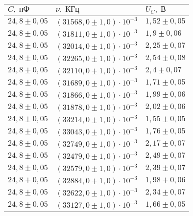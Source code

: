 \begin{tabular}{|l|l|l|}
\hline
$C,\;\text{нФ}$ & $\nu,\;\text{КГц}$ & $U_C,\;\text{В}$\\\hline
$24{,}8 \pm 0{,}05$ & $\left(31568{,}0 \pm 1{,}0\right)\cdot 10^{-3}$ & $1{,}52 \pm 0{,}05$\\\hline
$24{,}8 \pm 0{,}05$ & $\left(31811{,}0 \pm 1{,}0\right)\cdot 10^{-3}$ & $1{,}9 \pm 0{,}06$\\\hline
$24{,}8 \pm 0{,}05$ & $\left(32014{,}0 \pm 1{,}0\right)\cdot 10^{-3}$ & $2{,}25 \pm 0{,}07$\\\hline
$24{,}8 \pm 0{,}05$ & $\left(32265{,}0 \pm 1{,}0\right)\cdot 10^{-3}$ & $2{,}54 \pm 0{,}08$\\\hline
$24{,}8 \pm 0{,}05$ & $\left(32110{,}0 \pm 1{,}0\right)\cdot 10^{-3}$ & $2{,}4 \pm 0{,}07$\\\hline
$24{,}8 \pm 0{,}05$ & $\left(31689{,}0 \pm 1{,}0\right)\cdot 10^{-3}$ & $1{,}71 \pm 0{,}05$\\\hline
$24{,}8 \pm 0{,}05$ & $\left(31866{,}0 \pm 1{,}0\right)\cdot 10^{-3}$ & $1{,}99 \pm 0{,}06$\\\hline
$24{,}8 \pm 0{,}05$ & $\left(31878{,}0 \pm 1{,}0\right)\cdot 10^{-3}$ & $2{,}02 \pm 0{,}06$\\\hline
$24{,}8 \pm 0{,}05$ & $\left(33214{,}0 \pm 1{,}0\right)\cdot 10^{-3}$ & $1{,}55 \pm 0{,}05$\\\hline
$24{,}8 \pm 0{,}05$ & $\left(33043{,}0 \pm 1{,}0\right)\cdot 10^{-3}$ & $1{,}76 \pm 0{,}05$\\\hline
$24{,}8 \pm 0{,}05$ & $\left(32749{,}0 \pm 1{,}0\right)\cdot 10^{-3}$ & $2{,}17 \pm 0{,}07$\\\hline
$24{,}8 \pm 0{,}05$ & $\left(32479{,}0 \pm 1{,}0\right)\cdot 10^{-3}$ & $2{,}49 \pm 0{,}07$\\\hline
$24{,}8 \pm 0{,}05$ & $\left(32579{,}0 \pm 1{,}0\right)\cdot 10^{-3}$ & $2{,}39 \pm 0{,}07$\\\hline
$24{,}8 \pm 0{,}05$ & $\left(32884{,}0 \pm 1{,}0\right)\cdot 10^{-3}$ & $1{,}98 \pm 0{,}06$\\\hline
$24{,}8 \pm 0{,}05$ & $\left(32622{,}0 \pm 1{,}0\right)\cdot 10^{-3}$ & $2{,}34 \pm 0{,}07$\\\hline
$24{,}8 \pm 0{,}05$ & $\left(33127{,}0 \pm 1{,}0\right)\cdot 10^{-3}$ & $1{,}66 \pm 0{,}05$\\\hline
\end{tabular}
